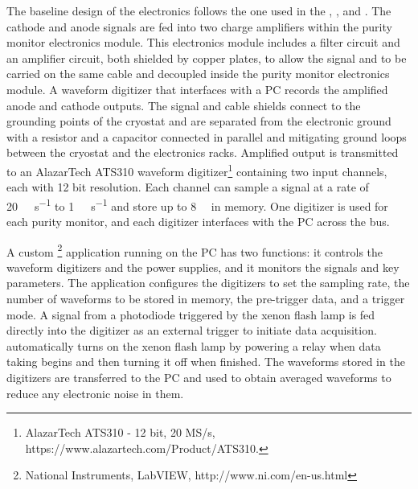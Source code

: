 The baseline design of the  electronics follows the one used in %
the , , 
and \microboone. The cathode and anode signals are fed into two charge amplifiers within the purity monitor electronics module.
This electronics module includes a  filter circuit and an amplifier circuit, both shielded by copper plates, to allow the signal and  to be carried on the same cable and decoupled inside the purity monitor electronics module. 
A waveform digitizer that interfaces with a  PC records the amplified anode and cathode outputs. 
The signal and  cable shields connect to the grounding points of the cryostat and are separated from the electronic ground with a resistor and a capacitor connected in parallel and mitigating ground loops between the cryostat and the electronics racks. Amplified output is transmitted to an AlazarTech ATS310 waveform digitizer\footnote{AlazarTech ATS310\texttrademark{} - 12 bit, 20 MS/s,  https://www.alazartech.com/Product/ATS310.} containing two input channels, each with 12 bit resolution. Each channel can sample a signal at a rate of \SI{20}{\mega\samples\per\second} to \SI{1}{\kilo\samples\per\second} and store up to \SI{8}{\mega\samples} in memory. One digitizer is used for each purity monitor, and each digitizer interfaces with the  PC across the  bus. 

A custom \footnote{National Instruments, LabVIEW\texttrademark{}, http://www.ni.com/en-us.html} application running on the  PC has two functions: it controls the waveform digitizers and the power supplies, and it monitors the signals and key parameters. The application configures the digitizers to set the sampling rate, the number of waveforms to be stored in memory, the pre-trigger data, and a trigger mode. A signal from a photodiode triggered by the xenon flash lamp is fed directly into the digitizer as an external trigger to initiate data acquisition.   automatically turns on the xenon flash lamp by powering a relay when data taking begins and then turning it off when finished.
The waveforms stored in the digitizers are transferred to the  PC and used to obtain averaged waveforms to reduce any electronic noise in them. %

